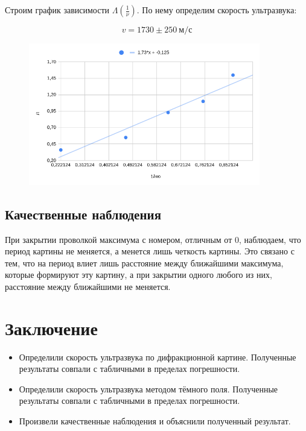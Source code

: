 \documentclass[14pt,a4paper]{article}
\begin{document}
Строим график зависимости $\Lambda(\frac{1}{\nu})$. По нему определим скорость ультразвука:

\[
\boxed{ v = 1730 \pm 250  \ \text{м/с}}
\]

\begin{figure}[H]
    	\centering
    	\includegraphics[width=0.9\textwidth]{Images/plot_4.png}
    	\label{shema1}
\end{figure}

\subsection*{Качественные наблюдения}
При закрытии проволкой максимума с номером, отличным от 0, наблюдаем, что период картины не меняется, а менется лишь четкость картины. Это связано с тем, что на период влиет лишь расстояние между ближайшими максимума, которые формируют эту картину, а при закрытии одного любого из них, расстояние между ближайшими не меняется.


\section*{Заключение}
\begin{itemize}
    \item Определили скорость ультразвука по дифракционной картине. Полученные результаты совпали с табличными в пределах погрешности.
    \item Определили скорость ультразвука методом тёмного поля. Полученные результаты совпали с табличными в пределах погрешности.
    \item Произвели качественные наблюдения и объяснили полученный результат.
\end{itemize}
\end{document}
